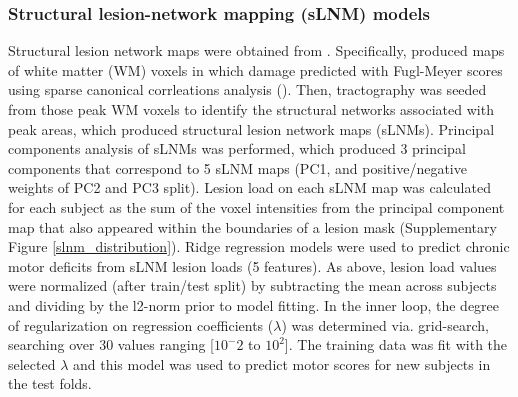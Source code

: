 \documentclass[phd,tocprelim]{cornell}
\begin{document}
\subsubsection{Structural lesion-network mapping (sLNM) models}
Structural lesion network maps were obtained from \cite{Bowren2022-rs}. Specifically, \cite{Bowren2022-rs} produced maps of white matter (WM) voxels in which damage predicted with Fugl-Meyer scores using sparse canonical corrleations analysis (\cite{Pustina2018-xv}). Then, tractography was seeded from those peak WM voxels to identify the structural networks associated with peak areas, which produced structural lesion network maps (sLNMs). Principal components analysis of sLNMs was performed, which produced 3 principal components that correspond to 5 sLNM maps (PC1, and positive/negative weights of PC2 and PC3 split). Lesion load on each sLNM map was calculated for each subject as the sum of the voxel intensities from the principal component map that also appeared within the boundaries of a lesion mask (Supplementary Figure \ref{slnm_distribution}). Ridge regression models were used to predict chronic motor deficits from sLNM lesion loads (5 features). As above, lesion load values were normalized (after train/test split) by subtracting the mean across subjects and dividing by the l2-norm prior to model fitting. In the inner loop, the degree of regularization on regression coefficients ($\lambda$) was determined via. grid-search, searching over 30 values ranging [$10^-2$ to $10^2$]. The training data was fit with the selected $\lambda$ and this model was used to predict motor scores for new subjects in the test folds. 
\end{document}
